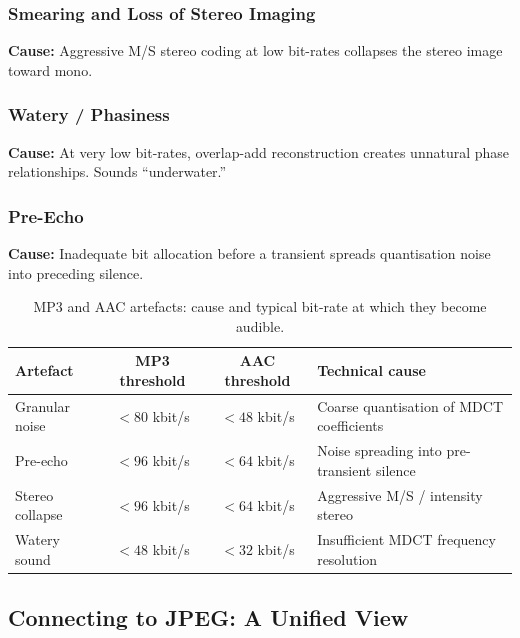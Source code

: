 \subsubsection{Smearing and Loss of Stereo Imaging}
\textbf{Cause:} Aggressive M/S stereo coding at low bit-rates collapses the stereo image toward mono.

\subsubsection{Watery / Phasiness}
\textbf{Cause:} At very low bit-rates, overlap-add reconstruction creates unnatural phase relationships. Sounds ``underwater.''

\subsubsection{Pre-Echo}
\textbf{Cause:} Inadequate bit allocation before a transient spreads quantisation noise into preceding silence.

\begin{table}[H]
\centering
\caption{MP3 and AAC artefacts: cause and typical bit-rate at which they become audible.}
\label{tab:artefacts}
\begin{tabular}{lccp{5cm}}
\toprule
\textbf{Artefact} & \textbf{MP3 threshold} & \textbf{AAC threshold} & \textbf{Technical cause} \\
\midrule
Granular noise   & $<80$ kbit/s & $<48$ kbit/s  & Coarse quantisation of MDCT coefficients \\
Pre-echo         & $<96$ kbit/s & $<64$ kbit/s  & Noise spreading into pre-transient silence \\
Stereo collapse  & $<96$ kbit/s & $<64$ kbit/s  & Aggressive M/S / intensity stereo \\
Watery sound     & $<48$ kbit/s & $<32$ kbit/s  & Insufficient MDCT frequency resolution \\
\bottomrule
\end{tabular}
\end{table}

\subsection{Connecting to JPEG: A Unified View}

